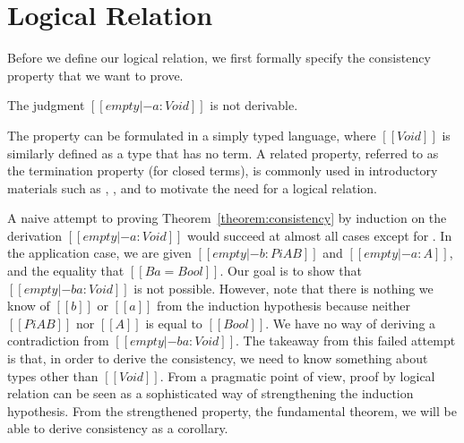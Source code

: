 \documentclass[acmsmall,screen=true,
\ifpublic review=false\else,review=true\fi
  ,anonymous=\ifanonymous true\else false\fi]{acmart}
\newcommand{\lang}{$\lambda^H$\xspace}
\newcommand{\scw}[1]{}
\begin{document}




\section{Logical Relation}
Before we define our logical relation, we first formally specify the
consistency property that we want to prove.
\begin{theorem}
  \label{theorem:consistency}
  The judgment $[[empty |- a : Void ]]$ is not derivable.
\end{theorem}
The property can be formulated in a simply typed language, where
$[[Void]]$ is similarly defined as a type that has no term. A related
property, referred to as the termination property (for closed terms),
is commonly used in introductory materials such as
\citet{skorstengaard2019introduction}, \citet{pierce2002types}, and
\citet{harpertait} to motivate the need for a logical relation.

A naive attempt to proving Theorem~\ref{theorem:consistency} by
induction on the derivation $[[empty |- a : Void]]$ would succeed at
almost all cases except for . In the application
case, we are given $[[empty |- b : Pi A B]]$ and $[[empty |- a : A]]$, and
the equality that $[[B {a} = Bool]]$. Our goal is to show that
$[[empty |- b a : Void]]$ is not possible. However, note that there is
nothing we know of $[[b]]$ or $[[a]]$ from the induction hypothesis
because neither $[[Pi A B]]$ nor $[[A]]$ is equal to $[[Bool]]$.
We have no way of deriving a contradiction from $[[empty |- b a :
Void]]$. The takeaway from this failed attempt is that, in order to
derive the consistency, we need to know something about types other
than $[[Void]]$. From a pragmatic point of view, proof by logical
relation can be seen as a sophisticated way of strengthening the
induction hypothesis. From the strengthened property, the fundamental
theorem, we will be able to derive consistency as a corollary.
\end{document}
